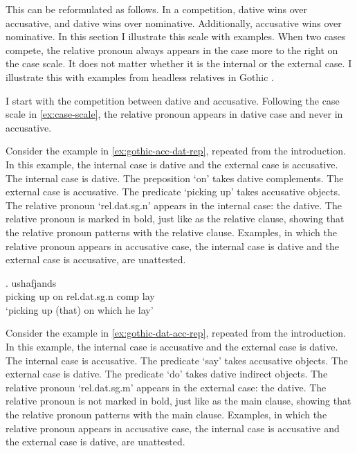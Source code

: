 This can be reformulated as follows. In a competition, dative wins over accusative, and dative wins over nominative. Additionally, accusative wins over nominative. In this section I illustrate this scale with examples. When two cases compete, the relative pronoun always appears in the case more to the right on the case scale. It does not matter whether it is the internal or the external case. I illustrate this with examples from headless relatives in Gothic \citep{harbert1978}.

I start with the competition between dative and accusative. Following the case scale in \ref{ex:case-scale}, the relative pronoun appears in dative case and never in accusative.

Consider the example in \ref{ex:gothic-acc-dat-rep}, repeated from the introduction. In this example, the internal case is dative and the external case is accusative.
The internal case is dative. The preposition  `on' takes dative complements.
The external case is accusative. The predicate  `picking up' takes accusative objects.
The relative pronoun  `\ac{rel}.\ac{dat}.\ac{sg}.\ac{n}' appears in the internal case: the dative. The relative pronoun is marked in bold, just like as the relative clause, showing that the relative pronoun patterns with the relative clause.
Examples, in which the relative pronoun appears in accusative case, the internal case is dative and the external case is accusative, are unattested.

\exg. ushafjands    \\
 {picking up}\scsub{[acc]} on\scsub{[dat]} \ac{rel}.\ac{dat}.\ac{sg}.\ac{n} \-\ac{comp} lay\\
 `picking up (that) on which he lay' \label{ex:gothic-acc-dat-rep}

Consider the example in \ref{ex:gothic-dat-acc-rep}, repeated from the introduction. In this example, the internal case is accusative and the external case is dative.
The internal case is accusative. The predicate  `say' takes accusative objects.
The external case is dative. The predicate  `do' takes dative indirect objects.
The relative pronoun  `\ac{rel}.\ac{dat}.\ac{sg}.\ac{m}' appears in the external case: the dative. The relative pronoun is not marked in bold, just like as the main clause, showing that the relative pronoun patterns with the main clause.
Examples, in which the relative pronoun appears in accusative case, the internal case is accusative and the external case is dative, are unattested.

